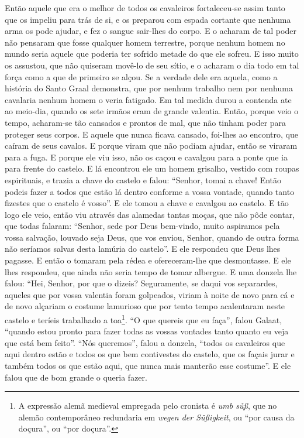 Então aquele que era o melhor de todos os cavaleiros fortaleceu-se assim tanto
que os impeliu para trás de si, e os preparou com espada cortante que nenhuma
arma os pode ajudar, e fez o sangue sair-lhes do corpo. E o acharam de tal
poder não pensaram que fosse qualquer homem terrestre, porque nenhum homem no
mundo seria aquele que poderia ter sofrido metade do que ele sofreu. E isso
muito os assustou, que não quiseram movê-lo de seu sítio, e o acharam o dia
todo em tal força como a que de primeiro se alçou. Se a verdade dele era
aquela, como a história do Santo Graal demonstra, que por nenhum trabalho nem
por nenhuma cavalaria nenhum homem o veria fatigado. Em tal medida durou a
contenda ate ao meio-dia, quando os sete irmãos eram de grande valentia. Então,
porque veio o tempo, acharam-se tão cansados e prontos de mal, que não tinham
poder para proteger seus corpos. E aquele que nunca ficava cansado, foi-lhes ao
encontro, que caíram de seus cavalos. E porque viram que não podiam ajudar,
então se viraram para a fuga. E porque ele viu isso, não os caçou e cavalgou
para a ponte que ia para frente do castelo. E lá encontrou ele um homem
grisalho, vestido com roupas espirituais, e trazia a chave do castelo e falou:
“Senhor, tomai a chave! Então podeis fazer a todos que estão lá dentro conforme
a vossa vontade, quando tanto fizestes que o castelo é vosso”. E ele tomou a
chave e cavalgou ao castelo. E tão logo ele veio, então viu através das
alamedas tantas moças, que não pôde contar, que todas falaram: “Senhor, sede
por Deus bem-vindo, muito aspiramos pela vossa salvação, louvado seja Deus, que
vos enviou, Senhor, quando de outra forma não seríamos salvas desta lamúria do
castelo”. E ele respondeu que Deus lhes pagasse. E então o tomaram pela rédea e
ofereceram-lhe que desmontasse. E ele lhes respondeu, que ainda não seria tempo
de tomar albergue. E uma donzela lhe falou: “Hei, Senhor, por que o dizeis?
Seguramente, se daqui vos separardes, aqueles que por vossa valentia foram
golpeados, viriam à noite de novo para cá e de novo alçariam o costume
lamurioso que por tento tempo acalentaram neste castelo e teríeis trabalhado a
toa\footnote{ A expressão alemã medieval empregada pelo cronista é \textit{umb
sůß}, que no alemão contemporâneo redundaria em \textit{wegen der Süßigkeit},
ou “por causa da doçura”, ou “por doçura”.}. “O que quereis que eu
faça”, falou Galaat, “quando estou pronto para fazer todas as vossas vontades
tanto quanto eu veja que está bem feito”. “Nós queremos”, falou a donzela,
“todos os cavaleiros que aqui dentro estão e todos os que bem contivestes do
castelo, que os façais jurar e também todos os que estão aqui, que nunca mais
manterão esse costume”. E ele falou que de bom grande o queria fazer. 

